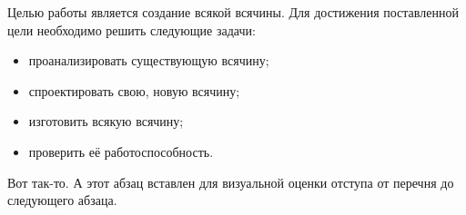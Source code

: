 \Introduction
{}

Целью работы является создание всякой всячины. Для достижения поставленной цели необходимо решить следующие задачи:

\begin{itemize}
\item проанализировать существующую всячину;
\item спроектировать свою, новую всячину;
\item изготовить всякую всячину;
\item проверить её работоспособность.
\end{itemize}

Вот так-то. А этот абзац вставлен для визуальной оценки отступа от перечня до следующего абзаца.
